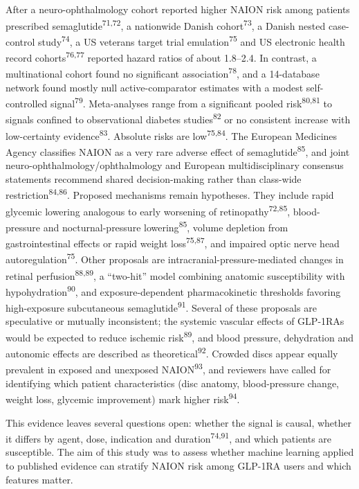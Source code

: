 \documentclass[
  11pt,
]{article}
\begin{document}
After a neuro-ophthalmology cohort reported higher NAION risk among
patients prescribed semaglutide\textsuperscript{71,72}, a nationwide
Danish cohort\textsuperscript{73}, a Danish nested case-control
study\textsuperscript{74}, a US veterans target trial
emulation\textsuperscript{75} and US electronic health record
cohorts\textsuperscript{76,77} reported hazard ratios of about 1.8--2.4.
In contrast, a multinational cohort found no significant
association\textsuperscript{78}, and a 14-database network found mostly
null active-comparator estimates with a modest self-controlled
signal\textsuperscript{79}. Meta-analyses range from a significant
pooled risk\textsuperscript{80,81} to signals confined to observational
diabetes studies\textsuperscript{82} or no consistent increase with
low-certainty evidence\textsuperscript{83}. Absolute risks are
low\textsuperscript{75,84}. The European Medicines Agency classifies
NAION as a very rare adverse effect of semaglutide\textsuperscript{85},
and joint neuro-ophthalmology/ophthalmology and European
multidisciplinary consensus statements recommend shared decision-making
rather than class-wide restriction\textsuperscript{84,86}. Proposed
mechanisms remain hypotheses. They include rapid glycemic lowering
analogous to early worsening of retinopathy\textsuperscript{72,85},
blood-pressure and nocturnal-pressure lowering\textsuperscript{85},
volume depletion from gastrointestinal effects or rapid weight
loss\textsuperscript{75,87}, and impaired optic nerve head
autoregulation\textsuperscript{75}. Other proposals are
intracranial-pressure-mediated changes in retinal
perfusion\textsuperscript{88,89}, a ``two-hit'' model combining anatomic
susceptibility with hypohydration\textsuperscript{90}, and
exposure-dependent pharmacokinetic thresholds favoring high-exposure
subcutaneous semaglutide\textsuperscript{91}. Several of these proposals
are speculative or mutually inconsistent; the systemic vascular effects
of GLP-1RAs would be expected to reduce ischemic
risk\textsuperscript{89}, and blood pressure, dehydration and autonomic
effects are described as theoretical\textsuperscript{92}. Crowded discs
appear equally prevalent in exposed and unexposed
NAION\textsuperscript{93}, and reviewers have called for identifying
which patient characteristics (disc anatomy, blood-pressure change,
weight loss, glycemic improvement) mark higher risk\textsuperscript{94}.

This evidence leaves several questions open: whether the signal is
causal, whether it differs by agent, dose, indication and
duration\textsuperscript{74,91}, and which patients are susceptible. The
aim of this study was to assess whether machine learning applied to
published evidence can stratify NAION risk among GLP-1RA users and which
features matter.
\end{document}
